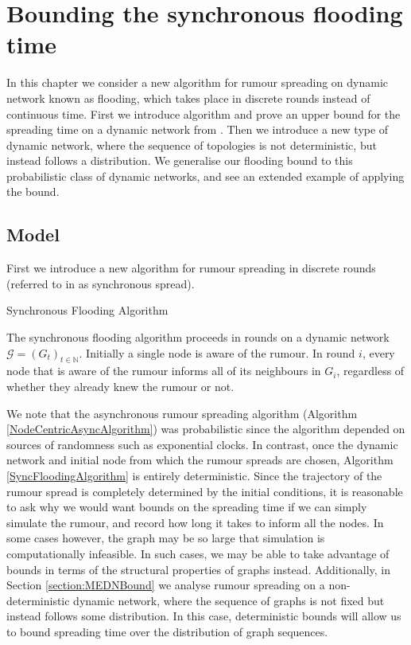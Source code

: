 \chapter{Bounding the synchronous flooding time}
\label{chapter:SyncFlooding}

In this chapter we consider a new algorithm for rumour spreading on dynamic network known as flooding, which takes place in discrete rounds instead of continuous time. First we introduce algorithm and prove an upper bound for the spreading time on a dynamic network from \cite{syncPaper}. Then we introduce a new type of dynamic network, where the sequence of topologies is not deterministic, but instead follows a distribution. We generalise our flooding bound to this probabilistic class of dynamic networks, and see an extended example of applying the bound.

\section{Model}

First we introduce a new algorithm for rumour spreading in discrete rounds (referred to in \cite{asyncPaper} as synchronous spread).

\begin{definition} \label{SyncFloodingAlgorithm}
	Synchronous Flooding Algorithm

	\noindent
	The synchronous flooding algorithm proceeds in rounds on a dynamic network $\mathcal{G} = (G_t)_{t \in \mathbb{N}}$. Initially a single node is aware of the rumour. In round $i$, every node that is aware of the rumour informs all of its neighbours in $G_i$, regardless of whether they already knew the rumour or not.
\end{definition}

We note that the asynchronous rumour spreading algorithm (Algorithm \ref{NodeCentricAsyncAlgorithm}) was probabilistic since the algorithm depended on sources of randomness such as exponential clocks. In contrast, once the dynamic network and initial node from which the rumour spreads are chosen, Algorithm \ref{SyncFloodingAlgorithm} is entirely deterministic. Since the trajectory of the rumour spread is completely determined by the initial conditions, it is reasonable to ask why we would want bounds on the spreading time if we can simply simulate the rumour, and record how long it takes to inform all the nodes. In some cases however, the graph may be so large that simulation is computationally infeasible. 
In such cases, we may be able to take advantage of bounds in terms of the structural properties of graphs instead. %
Additionally, in Section \ref{section:MEDNBound}
we analyse rumour spreading on a non-deterministic dynamic network, where the sequence of graphs is not fixed but instead follows some distribution. 
In this case, deterministic bounds will allow us to bound spreading time over the distribution of graph sequences. %

